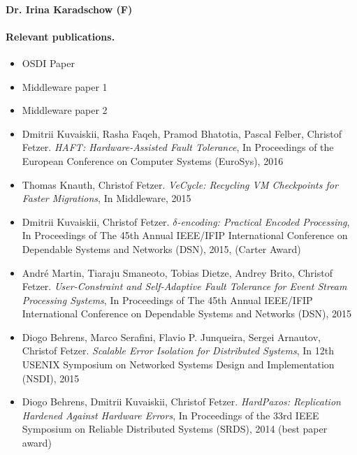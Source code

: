 \smallskip
\noindent
\paragraph{Dr. Irina Karadschow (F)} \smallskip
\noindent

\paragraph{Relevant publications.}

\begin{itemize}

\item OSDI Paper

\item Middleware paper 1

\item Middleware paper 2

\item Dmitrii Kuvaiskii, Rasha Faqeh, Pramod Bhatotia, Pascal Felber, Christof Fetzer. \emph{HAFT: Hardware-Assisted Fault Tolerance},
In Proceedings of the European Conference on Computer Systems (EuroSys), 2016

\item Thomas Knauth, Christof Fetzer. \emph{VeCycle: Recycling VM Checkpoints for Faster Migrations}, In Middleware, 2015

\item Dmitrii Kuvaiskii, Christof Fetzer. \emph{$\delta$-encoding: Practical Encoded Processing},
In Proceedings of The 45th Annual IEEE/IFIP International Conference on Dependable Systems and Networks (DSN), 2015, (Carter Award)

\item Andr{\'e} Martin, Tiaraju Smaneoto, Tobias Dietze, Andrey Brito, Christof Fetzer.
\emph{User-Constraint and Self-Adaptive Fault Tolerance for Event Stream Processing Systems},
In Proceedings of The 45th Annual IEEE/IFIP International Conference on Dependable Systems and Networks (DSN), 2015

\item Diogo Behrens, Marco Serafini, Flavio P. Junqueira, Sergei Arnautov, Christof Fetzer.
\emph{Scalable Error Isolation for Distributed Systems},
In 12th USENIX Symposium on Networked Systems Design and Implementation (NSDI), 2015

\item  Diogo Behrens, Dmitrii Kuvaiskii, Christof Fetzer. \emph{HardPaxos: Replication Hardened Against Hardware Errors},
In Proceedings of the 33rd IEEE Symposium on Reliable Distributed Systems (SRDS), 2014 (best paper award)

\end{itemize}
 
